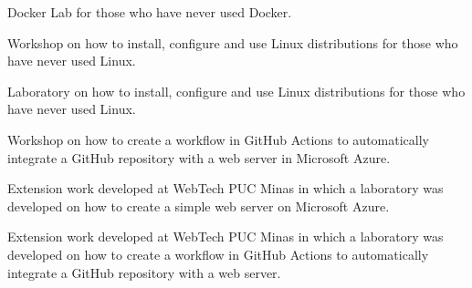 \documentclass[10pt,a4paper,ragged2e,withhyper]{altacv}
\begin{document}
\begin{paracol}{2}
            Docker Lab for those who have never used Docker.\\
            \divider

            Workshop on how to install, configure and use Linux distributions for those who have never used Linux.\\
            \divider

            Laboratory on how to install, configure and use Linux distributions for those who have never used Linux.\\
            \divider

            Workshop on how to create a workflow in GitHub Actions to automatically integrate a GitHub repository with a web server in Microsoft Azure.\\
            \divider

            Extension work developed at WebTech PUC Minas in which a laboratory was developed on how to create a simple web server on Microsoft Azure.\\
            \divider
        
            Extension work developed at WebTech PUC Minas in which a laboratory was developed on how to create a workflow in GitHub Actions to automatically integrate a GitHub repository with a web server.\\
            \divider


\end{paracol}
\end{document}
